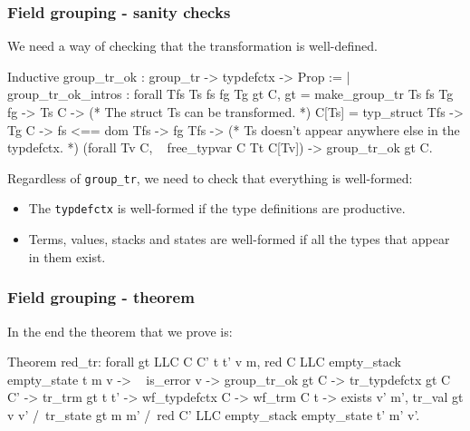 \begin{frame}[fragile]
\frametitle{Field grouping - sanity checks}

We need a way of checking that the transformation is well-defined.

\begin{coqs}
Inductive group_tr_ok : group_tr -> typdefctx -> Prop :=
  | group_tr_ok_intros : forall Tfs Ts fs fg Tg gt C,
      gt = make_group_tr Ts fs Tg fg ->
      Ts \indom C ->
      (* The struct Ts can be transformed. *)
      C[Ts] = typ_struct Tfs ->
      Tg \notindom C ->
      fs <== dom Tfs ->
      fg \notindom Tfs ->
      (* Ts doesn't appear anywhere else in the typdefctx. *)
      (forall Tv \indom C, ~ free_typvar C Tt C[Tv]) ->
      group_tr_ok gt C.
\end{coqs}

\bigskip \pause

Regardless of \texttt{group\_tr}, we need to check that everything is well-formed:
\begin{itemize}
	\item The \texttt{typdefctx} is well-formed if the type definitions are productive. \pause
	\item Terms, values, stacks and states are well-formed if all the types that appear in them exist.
\end{itemize}

\end{frame}


\begin{frame}[fragile]
\frametitle{Field grouping - theorem}

In the end the theorem that we prove is:

\begin{coq}
Theorem red_tr: forall gt LLC C C' t t' v m,
  red C LLC empty_stack empty_state t m v ->
  ~ is_error v ->
  group_tr_ok gt C ->
  tr_typdefctx gt C C' ->
  tr_trm gt t t' ->
  wf_typdefctx C ->
  wf_trm C t ->
  exists v' m',		tr_val gt v v'
		 /\ tr_state gt m m'
		 /\ red C' LLC empty_stack empty_state t' m' v'.
\end{coq}

\end{frame}


